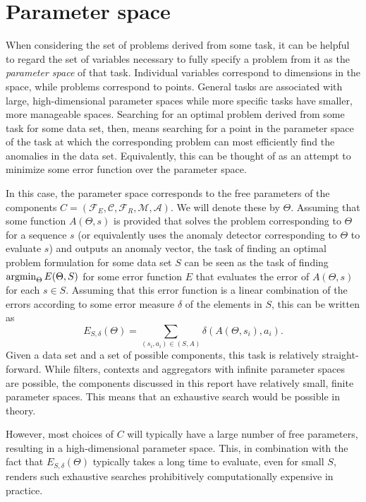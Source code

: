 \section{Parameter space}

When considering the set of problems derived from some task, it can be helpful to regard the set of variables necessary to fully specify a problem from it as the \emph{parameter space} of that task. Individual variables correspond to dimensions in the space, while problems correspond to points. General tasks are associated with large, high-dimensional parameter spaces while more specific tasks have smaller, more manageable spaces.  Searching for an optimal problem derived from some task for some data set, then, means searching for a point in the parameter space of the task at which the corresponding problem can most efficiently find the anomalies in the data set. Equivalently, this can be thought of as an attempt to minimize some error function over the parameter space. 

In this case, the parameter space corresponds to the free parameters of the components $C = (\mathcal{F}_E, \mathcal{C}, \mathcal{F}_R, \mathcal{M},\mathcal{A})$. We will denote these by $\Theta$. Assuming that some function $A(\Theta, s)$ is provided that solves the problem corresponding to $\Theta$ for a sequence $s$ (or equivalently uses the anomaly detector corresponding to $\Theta$ to evaluate $s$) and outputs an anomaly vector, the task of finding an optimal problem formulation for some data set $S$ can be seen as the task of finding $\argmin_\Theta E(\Theta, S)$ for some error function $E$ that evaluates the error of $A(\Theta, s)$ for each $s \in S$. Assuming that this error function is a linear combination of the errors according to some error measure $\delta$ of the elements in $S$, this can be written as 
\[
    E_{S, \delta}(\Theta) = \sum_{(s_i, a_i) \in (S, A)} \delta(A(\Theta, s_i), a_i).
\]
Given a data set and a set of possible components, this task is relatively straight-forward. While filters, contexts and aggregators with infinite parameter spaces are possible, the components discussed in this report have relatively small, finite parameter spaces. This means that an exhaustive search would be possible in theory.

However, most choices of $C$ will typically have a large number of free parameters, resulting in a high-dimensional parameter space. This, in combination with the fact that $E_{S, \delta}(\Theta)$ typically takes a long time to evaluate, even for small $S$, renders such exhaustive searches prohibitively computationally expensive in practice.

